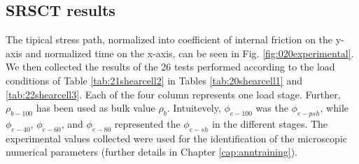\subsection{SRSCT results}
\label{subsec:srsctresults}

The tipical stress path, normalized into coefficient of internal friction on the
y-axis and normalized time on the x-axis, can be seen in Fig.
\ref{fig:020experimental}.\\
We then collected the results of the 26 tests performed according to the load
conditions of Table \ref{tab:21shearcell2} in Tables \ref{tab:20shearcell1}
and \ref{tab:22shearcell3}.
Each of the four column represents one load stage.
Further, $\rho_{b-100}$ has been used as bulk value $\rho_{b}$.
Intuitevely, $\phi_{e-100}$ was the $\phi_{e-psh}$, while $\phi_{e-40}$,
$\phi_{e-60}$, and $\phi_{e-80}$ represented the $\phi_{e-sh}$ in the different
stages.
The experimental values collected were used for the identification of the
microscopic numerical parameters (further details in Chapter
\ref{cap:anntraining}).


